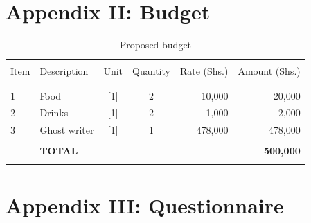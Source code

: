 \clearpage  %
\section*{Appendix II: Budget}
%

\begin{table}[H]
	\begin{center}
		\caption{\label{tbl:Budget}Proposed budget}
		\begin{tabular}{llccrr}
			\hline \\
				Item & Description    & Unit      & Quantity  & Rate (Shs.) & Amount (Shs.)    \\
			\\
			\hline \\				
				1    & Food           & [1]       & 2         & 10,000      & 20,000           \\
				2    & Drinks         & [1]       & 2         & 1,000       & 2,000            \\
				3    & Ghost writer   & [1]       & 1         & 478,000     & 478,000          \\
			\\
					 & \textbf{TOTAL} &           &           &             & \textbf{500,000}\\
			\hline \\ 
		\end{tabular}
	\end{center}
\end{table}

\clearpage  %
\section*{Appendix III: Questionnaire}
%

